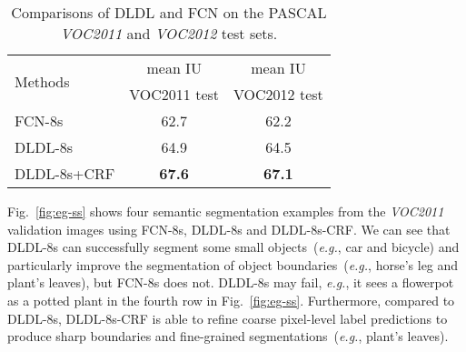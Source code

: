 \documentclass[journal]{IEEEtran}
\begin{document}
\begin{table}
	\centering
	\caption{Comparisons of DLDL and FCN on the PASCAL \emph{VOC2011} and \emph{VOC2012} test sets.}\label{table:ss_test}
	\small
	\begin{tabular}{|l|cc|}
		\hline
		\multirow{2}{*}{Methods}  &mean IU &mean IU \\
           &VOC2011 test  &VOC2012 test \\
        \hline\hline
        FCN-8s~\cite{long2015fully}  &62.7 &62.2 \\
        DLDL-8s &64.9 &64.5 \\
        DLDL-8s+CRF &\textbf{67.6} &\textbf{67.1} \\
        \hline
	\end{tabular}
\end{table}

Fig.~\ref{fig:eg-ss} shows four semantic segmentation examples from the \emph{VOC2011} validation images using FCN-8s, DLDL-8s and DLDL-8s-CRF. We can see that DLDL-8s can successfully segment some small objects~(\emph{e.g.}, car and bicycle) and particularly improve the segmentation of object boundaries~(\emph{e.g.}, horse's leg and plant's leaves), but FCN-8s does not. DLDL-8s may fail, \emph{e.g.}, it sees a flowerpot as a potted plant in the fourth row in Fig.~\ref{fig:eg-ss}. Furthermore, compared to DLDL-8s, DLDL-8s-CRF is able to refine coarse pixel-level label predictions to produce sharp boundaries and fine-grained segmentations~(\emph{e.g.}, plant's leaves).
\end{document}
